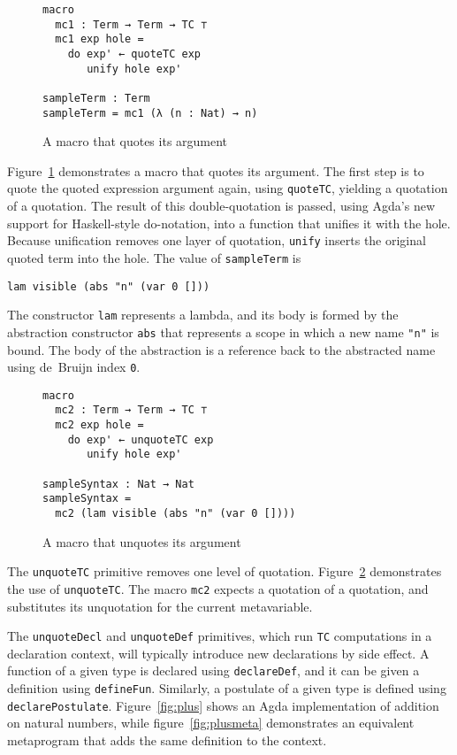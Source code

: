 \documentclass[sigplan,10pt]{acmart}
\begin{document}
\begin{figure}
\begin{Verbatim}
macro
  mc1 : Term → Term → TC ⊤
  mc1 exp hole =
    do exp' ← quoteTC exp
       unify hole exp'

sampleTerm : Term
sampleTerm = mc1 (λ (n : Nat) → n)
\end{Verbatim}
  \caption{A macro that quotes its argument}
  \label{fig:macro1}
\end{figure}


Figure~\ref{fig:macro1} demonstrates a macro that quotes its argument.
The first step is to quote the quoted expression argument again, using \texttt{quoteTC}, yielding a quotation of a quotation.
The result of this double-quotation is passed, using Agda's new support for Haskell-style do-notation, into a function that unifies it with the hole.
Because unification removes one layer of quotation, \texttt{unify} inserts the original quoted term into the hole.
The value of {\tt sampleTerm} is
\begin{center}
\begin{BVerbatim}
lam visible (abs "n" (var 0 []))
\end{BVerbatim}
\end{center}
The constructor \texttt{lam} represents a lambda, and its body is formed by the abstraction constructor \texttt{abs} that represents a scope in which a new name \texttt{"n"} is bound.
The body of the abstraction is a reference back to the abstracted name using de~Bruijn index \texttt{0}.

\begin{figure}
  \centering
\begin{Verbatim}
macro
  mc2 : Term → Term → TC ⊤
  mc2 exp hole =
    do exp' ← unquoteTC exp
       unify hole exp'

sampleSyntax : Nat → Nat
sampleSyntax =
  mc2 (lam visible (abs "n" (var 0 [])))
\end{Verbatim}
  \caption{A macro that unquotes its argument}
  \label{fig:macro2}
\end{figure}

The {\tt unquoteTC} primitive removes one level of quotation.
Figure~\ref{fig:macro2} demonstrates the use of \texttt{unquoteTC}.
The macro {\tt mc2} expects a quotation of a quotation, and substitutes its unquotation for the current metavariable.


The {\tt unquoteDecl} and {\tt unquoteDef} primitives, which run \texttt{TC} computations in a declaration context, will typically introduce new declarations by side effect.
A function of a given type is declared using {\tt declareDef}, and it can be given a definition using {\tt defineFun}.
Similarly, a postulate of a given type is defined using {\tt declarePostulate}.
Figure~\ref{fig:plus} shows an Agda implementation of addition on natural numbers, while figure~\ref{fig:plusmeta} demonstrates an equivalent metaprogram that adds the same definition to the context.
\end{document}
